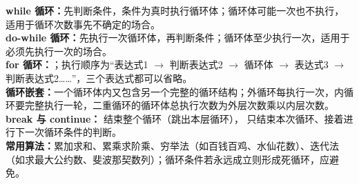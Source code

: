 \documentclass[a4paper,11pt]{article}
\begin{document}

\begin{knowmap}
\textbf{while 循环：}先判断条件，条件为真时执行循环体；循环体可能一次也不执行，适用于循环次数事先不确定的场合。\\[2pt]
\textbf{do-while 循环：}先执行一次循环体，再判断条件；循环体至少执行一次，适用于必须先执行一次的场合。\\[2pt]
\textbf{for 循环：}；执行顺序为“表达式1 $\rightarrow$ 判断表达式2 $\rightarrow$ 循环体 $\rightarrow$ 表达式3 $\rightarrow$ 判断表达式2……”，三个表达式都可以省略。\\[2pt]
\textbf{循环嵌套：}一个循环体内又包含另一个完整的循环结构；外循环每执行一次，内循环要完整执行一轮，二重循环的循环体总执行次数为外层次数乘以内层次数。\\[2pt]
\textbf{break 与 continue：} 结束整个循环（跳出本层循环）， 只结束本次循环、接着进行下一次循环条件的判断。\\[2pt]
\textbf{常用算法：}累加求和、累乘求阶乘、穷举法（如百钱百鸡、水仙花数）、迭代法（如求最大公约数、斐波那契数列）；循环条件若永远成立则形成死循环，应避免。
\end{knowmap}
\end{document}
